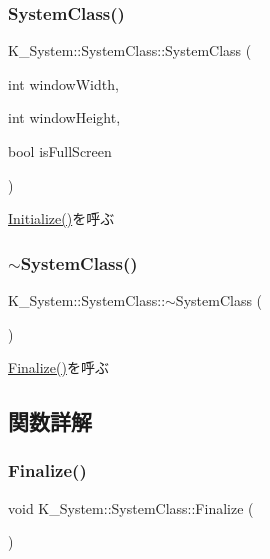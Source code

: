 \subsubsection{\texorpdfstring{System\+Class()}{SystemClass()}}
{\footnotesize\ttfamily K\+\_\+\+System\+::\+System\+Class\+::\+System\+Class (\begin{DoxyParamCaption}\item[{int}]{window\+Width,  }\item[{int}]{window\+Height,  }\item[{bool}]{is\+Full\+Screen }\end{DoxyParamCaption})}



\mbox{\hyperlink{class_k___system_1_1_system_class_a2db013b3b45f150df5355fd5265c8705}{Initialize()}}を呼ぶ 

\mbox{\label{class_k___system_1_1_system_class_a5bdd9b6b328727510a660dc7ab9ea8ac}} 
\subsubsection{\texorpdfstring{$\sim$\+System\+Class()}{~SystemClass()}}
{\footnotesize\ttfamily K\+\_\+\+System\+::\+System\+Class\+::$\sim$\+System\+Class (\begin{DoxyParamCaption}{ }\end{DoxyParamCaption})}



\mbox{\hyperlink{class_k___system_1_1_system_class_a93d05d4f421da35f53c4969e53ca7d49}{Finalize()}}を呼ぶ 



\subsection{関数詳解}
\mbox{\label{class_k___system_1_1_system_class_a93d05d4f421da35f53c4969e53ca7d49}} 
\subsubsection{\texorpdfstring{Finalize()}{Finalize()}}
{\footnotesize\ttfamily void K\+\_\+\+System\+::\+System\+Class\+::\+Finalize (\begin{DoxyParamCaption}{ }\end{DoxyParamCaption})}



